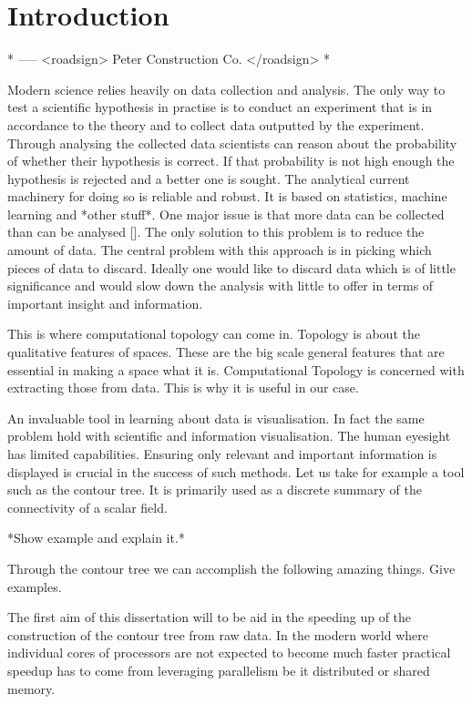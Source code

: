 \chapter{Introduction}
\label{chapter1}

* ----- <roadsign> Peter Construction Co. </roadsign> *

Modern science relies heavily on data collection and analysis. The only way to test a scientific hypothesis in practise is to conduct an experiment that is in accordance to the theory and to collect data outputted by the experiment. Through analysing the collected data scientists can reason about the probability of whether their hypothesis is correct. If that probability is not high enough the hypothesis is rejected and a better one is sought. The analytical current machinery for doing so is reliable and robust. It is based on statistics, machine learning and *other stuff*. One major issue is that more data can be collected than can be analysed []. The only solution to this problem is to reduce the amount of data. The central problem with this approach is in picking which pieces of data to discard. Ideally one would like to discard data which is of little significance and would slow down the analysis with little to offer in terms of important insight and information.

This is where computational topology can come in. Topology is about the qualitative features of spaces. These are the big scale general features that are essential in making a space what it is. Computational Topology is concerned with extracting those from data. This is why it is useful in our case.

An invaluable tool in learning about data is visualisation. In fact the same problem hold with scientific and information visualisation. The human eyesight has limited capabilities. Ensuring only relevant and important information is displayed is crucial in the success of such methods. Let us take for example a tool such as the contour tree. It is primarily used as a discrete summary of the connectivity of a scalar field.

*Show example and explain it.*

Through the contour tree we can accomplish the following amazing things. Give examples.

The first aim of this dissertation will to be aid in the speeding up of the construction of the contour tree from raw data. In the modern world where individual cores of processors are not expected to become much faster practical speedup has to come from leveraging parallelism be it distributed or shared memory. 

